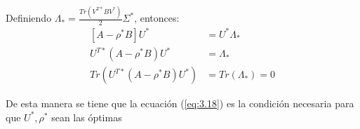 Definiendo $\Lambda_* = \frac{Tr(V^{T*} B V^*)}{2}\Sigma^*$, entonces:
\begin{equation}\label{eq:3.18}
\begin{aligned}
\left[ A-\rho^* B\right]U^*   &= U^* \Lambda_* \\
 U^{T*} \left(A-\rho^* B\right)U^*   &=  \Lambda_* \\
 Tr(U^{T*} \left(A-\rho^* B\right)U^*)   &=  Tr(\Lambda_*) = 0
\end{aligned}
\end{equation}  

De esta manera se tiene que la ecuación (\ref{eq:3.18}) es la condición necesaria para que $U^*, \rho^*$ sean las óptimas









